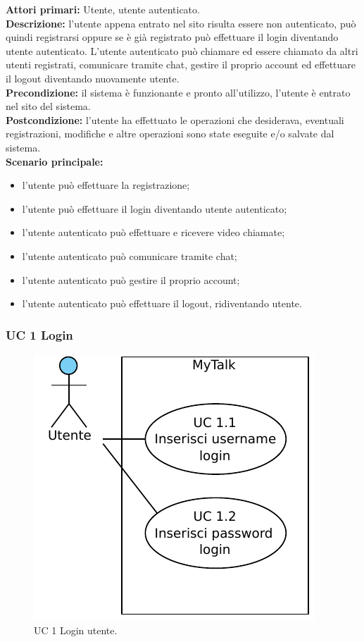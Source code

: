 \noindent
\textbf{Attori primari:} Utente, utente autenticato.\\
\textbf{Descrizione:} l'utente appena entrato nel sito risulta essere non autenticato, può quindi registrarsi oppure se è già registrato può effettuare il login diventando utente autenticato. L'utente autenticato può chiamare ed essere chiamato da altri utenti registrati, comunicare tramite chat, gestire il proprio account ed effettuare il logout diventando nuovamente utente.\\
\textbf{Precondizione:}  il sistema è funzionante e pronto all'utilizzo, l'utente è entrato nel sito del sistema.\\
\textbf{Postcondizione:} l'utente ha effettuato le operazioni che desiderava, eventuali registrazioni, modifiche e altre operazioni sono state eseguite e/o salvate dal sistema.\\
\textbf{Scenario principale:}
\begin{itemize}
\item l'utente può effettuare la registrazione;
\item l'utente può effettuare il login diventando utente autenticato;
\item l'utente autenticato può effettuare e ricevere video chiamate;
\item l'utente autenticato può comunicare tramite chat;
\item l'utente autenticato può gestire il proprio account;
\item l'utente autenticato può effettuare il logout, ridiventando utente.
\end{itemize} 

\subsubsection{UC 1 Login}

\begin{figure}[htbp]
\centering
\includegraphics[scale=0.7]{./casi_uso/UC1.pdf}
\caption{UC 1 Login utente.}
\end{figure}

